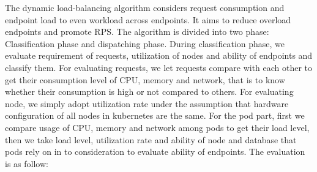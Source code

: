 The dynamic load-balancing algorithm considers request consumption and endpoint load to even workload across endpoints. It aims to reduce overload endpoints and promote RPS. The algorithm is divided into two phase: Classification phase and dispatching phase.
During classification phase, we evaluate requirement of requests, utilization of nodes and ability of endpoints and classify them. For evaluating requests, we let requests compare with each other to get their consumption level of CPU, memory and network, that is to know whether their consumption is high or not compared to others. For evaluating node, we simply adopt utilization rate under the assumption that hardware configuration of all nodes in kubernetes are the same. For the pod part, first we compare usage of CPU, memory and network among pods to get their load level, then we take load level, utilization rate and ability of node and database that pods rely on in to consideration to evaluate ability of endpoints. The evaluation is as follow:
